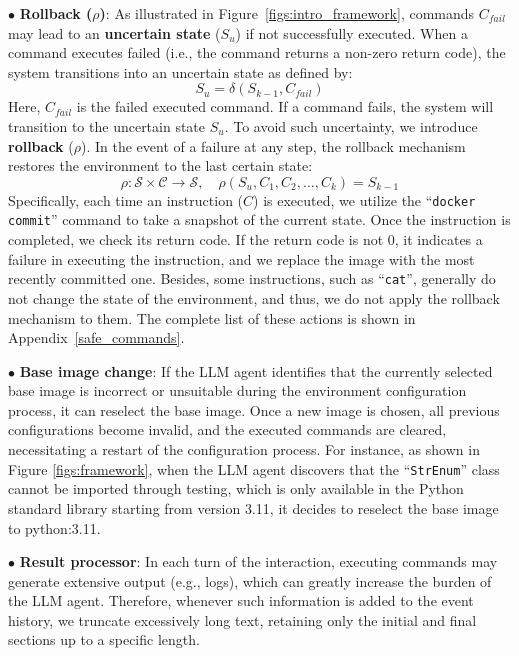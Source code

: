 $\bullet$ \textbf{Rollback ($\rho$)}:
As illustrated in Figure~\ref{figs:intro_framework}, commands $C_{fail}$ may lead to an \textbf{uncertain state} ($S_u$) if not successfully executed. When a command executes failed (i.e., the command returns a non-zero return code), the system transitions into an uncertain state as defined by:
\begin{equation}
    S_u = \delta(S_{k-1}, C_{fail})
\end{equation}
Here, $C_{fail}$ is the failed executed command.
If a command fails, the system will transition to the uncertain state $S_u$.
To avoid such uncertainty, we introduce \textbf{rollback} ($\rho$). In the event of a failure at any step, the rollback mechanism restores the environment to the last certain state:
\begin{equation}
\rho: \mathcal{S} \times \mathcal{C} \rightarrow \mathcal{S},\quad \rho(S_u, { C_1, C_2, \ldots, C_k }) = S_{k-1}   
\end{equation}
Specifically, each time an instruction ($C$) is executed, we utilize the ``\texttt{docker commit}'' command to take a snapshot of the current state. Once the instruction is completed, we check its return code. If the return code is not 0, it indicates a failure in executing the instruction, and we replace the image with the most recently committed one. Besides, some instructions, such as ``\texttt{cat}'', generally do not change the state of the environment, and thus, we do not apply the rollback mechanism to them. The complete list of these actions is shown in Appendix~\ref{safe_commands}.

$\bullet$ \textbf{Base image change}:
If the LLM agent identifies that the currently selected base image is incorrect or unsuitable during the environment configuration process, it can reselect the base image. Once a new image is chosen, all previous configurations become invalid, and the executed commands are cleared, necessitating a restart of the configuration process. For instance, as shown in Figure \ref{figs:framework}, when the LLM agent discovers that the ``\texttt{StrEnum}'' class cannot be imported through testing, which is only available in the Python standard library starting from version 3.11, it decides to reselect the base image to python:3.11.

$\bullet$ \textbf{Result processor}:
In each turn of the interaction, executing commands may generate extensive output (e.g., logs), which can greatly increase the burden of the LLM agent. Therefore, whenever such information is added to the event history, we truncate excessively long text, retaining only the initial and final sections up to a specific length.

